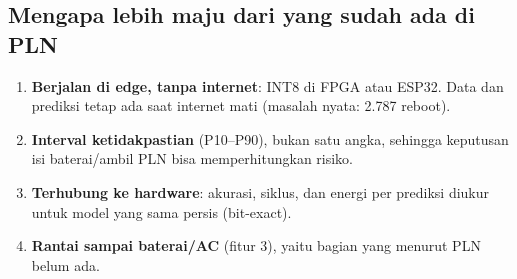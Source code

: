 \documentclass[10.5pt,a4paper]{article}
\begin{document}
\subsection{Mengapa lebih maju dari yang sudah ada di PLN}
\begin{enumerate}
  \item \textbf{Berjalan di edge, tanpa internet}: INT8 di FPGA atau ESP32. Data dan prediksi tetap ada saat internet mati (masalah nyata: 2.787 reboot).
  \item \textbf{Interval ketidakpastian} (P10--P90), bukan satu angka, sehingga keputusan isi baterai/ambil PLN bisa memperhitungkan risiko.
  \item \textbf{Terhubung ke hardware}: akurasi, siklus, dan energi per prediksi diukur untuk model yang sama persis (bit-exact).
  \item \textbf{Rantai sampai baterai/AC} (fitur 3), yaitu bagian yang menurut PLN belum ada.
\end{enumerate}
\end{document}

